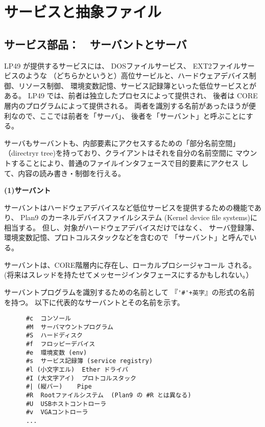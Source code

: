 


\chapter{サービスと抽象ファイル}

\section{サービス部品：　サーバントとサーバ}
      LP49 が提供するサービスには、 DOSファイルサービス、 EXT2ファイルサービスのような
      （どちらかというと）高位サービルと、ハードウェアデバイス制御、リソース制御、
      環境変数記憶、サービス記録簿といった低位サービスとがある。
      LP49 では、前者は独立したプロセスによって提供され、
      後者は CORE 層内のプログラムによって提供される。
      両者を識別する名前があったほうが便利なので、ここでは前者を「サーバ」、
      後者を「サーバント」と呼ぶことにする。

      サーバもサーバントも、内部要素にアクセスするための「部分名前空間」
      （directryr tree)を持っており、クライアントはそれを自分の名前空間に
        マウントすることにより、普通のファイルインタフェースで目的要素にアクセス
    して、内容の読み書き・制御を行える。

    
 {\bf\flushleft (1)サーバント}

     サーバントはハードウェアデバイスなど低位サービスを提供するための機能であり、
     Plan9 のカーネルデバイスファイルシステム (Kernel device file systems)に相当する。
     但し、対象がハードウェアデバイスだけではなく、
     サーバ登録簿、環境変数記憶、プロトコルスタックなどを含むので
    「サーバント」と呼んでいる。

      サーバントは、CORE階層内に存在し、ローカルプロシージャコール
      される。
      (将来はスレッドを持たせてメッセージインタフェースにするかもしれない。）

      サーバントプログラムを識別するための名前として
      『\verb|'#'+英字|』の形式の名前を持つ。
    以下に代表的なサーバントとその名前を示す。

{\small
\begin{verbatim}
      #c  コンソール
      #M  サーバマウントプログラム
      #S  ハードディスク
      #f  フロッピーデバイス
      #e  環境変数 (env)
      #s  サービス記録簿 (service registry)
      #l (小文字エル)  Ether ドライバ
      #I (大文字アイ)  プロトコルスタック
      #| (縦バー)    Pipe
      #R  Rootファイルシステム  (Plan9 の #R とは異なる)
      #U  USBホストコントローラ
      #v  VGAコントローラ
      ...
\end{verbatim}
}


